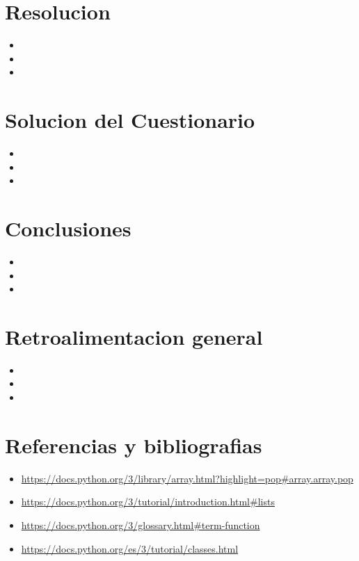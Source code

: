 \documentclass[]{article}
\begin{document}
    \section{Resolucion}
    	\begin{itemize}		
    		\item 
    		\item 
    		\item 
    	\end{itemize}
    \section{Solucion del Cuestionario}
    	\begin{itemize}		
    		\item 
    		\item 
    		\item 
    	\end{itemize}
    \section{Conclusiones}
    	\begin{itemize}		
    		\item 
    		\item 
    		\item 
    	\end{itemize}
    \section{Retroalimentacion general}
    	\begin{itemize}		
    		\item 
    		\item 
    		\item 
    	\end{itemize}
    \section{Referencias y bibliografias}
    	\begin{itemize}		
    		\item \url{https://docs.python.org/3/library/array.html?highlight=pop#array.array.pop}
    		\item \url{https://docs.python.org/3/tutorial/introduction.html#lists}
    		\item 
            \url{https://docs.python.org/3/glossary.html#term-function}
            \item \url{https://docs.python.org/es/3/tutorial/classes.html}
    	\end{itemize}
     
\end{document}
